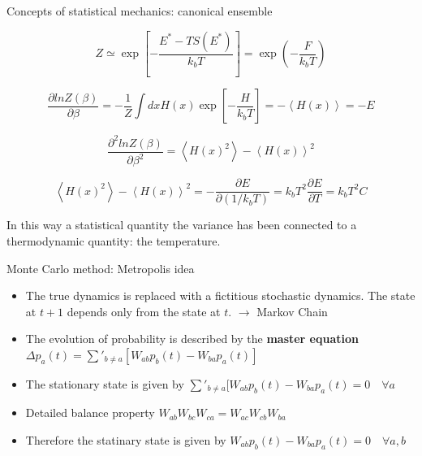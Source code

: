 \documentclass{beamer}
\begin{document}
\begin{frame}{Concepts of statistical mechanics: canonical ensemble\cite{peliti2011statistical} }

\begin{equation}
Z\simeq \exp\left[-\dfrac{E^{*}-TS(E^{*})}{k_{b}T} \right]=\exp\left( - \frac{F}{k_{b}T}  \right)     
\end{equation}

\begin{equation}
\dfrac{\partial ln Z(\beta)}{\partial \beta}=-\dfrac{1}{Z}\int dx H(x)\exp\left[  -\dfrac{H}{k_{b}T}\right]=-\left\langle H(x) \right\rangle=-E
\end{equation}

\begin{equation}
\dfrac{\partial^{2} ln Z(\beta)}{\partial \beta^{2}}=\left\langle H(x)^{2} \right\rangle-\left\langle H(x) \right\rangle^{2}
\end{equation}

\begin{equation}
\left\langle H(x)^{2} \right\rangle-\left\langle H(x) \right\rangle^{2}=-\dfrac{\partial E}{\partial (1/k_{b}T)}=k_{b}T^{2}\dfrac{\partial E}{\partial T}=k_{b}T^{2}C
\end{equation}

In this way a statistical quantity the variance has been connected to a thermodynamic quantity: the temperature.

\end{frame}

\begin{frame}{Monte Carlo method: Metropolis idea \cite{peliti2011statistical}}

\begin{itemize}

\item The true dynamics is replaced with a fictitious stochastic dynamics.  The state at $t+1$ depends only from the state at $t$.  $\rightarrow$ Markov Chain 

\item The evolution of probability is described by the \textbf{master equation} $\Delta p_{a}(t)=\sum'_{b\neq a}[W_{ab}p_{b}(t)-W_{ba}p_{a}(t)]$

\item The stationary state is given by \rightarrow $ \sum'_{b\neq a}[W_{ab}p_{b}(t)-W_{ba}p_{a}(t)=0\quad \forall a$

\item Detailed balance property $W_{ab}W_{bc}W_{ca}=W_{ac}W_{cb}W_{ba}$

\item Therefore the statinary state is given by $ W_{ab}p_{b}(t)-W_{ba}p_{a}(t)=0\quad \forall a,b$

\end{itemize}

\end{frame}
\end{document}
